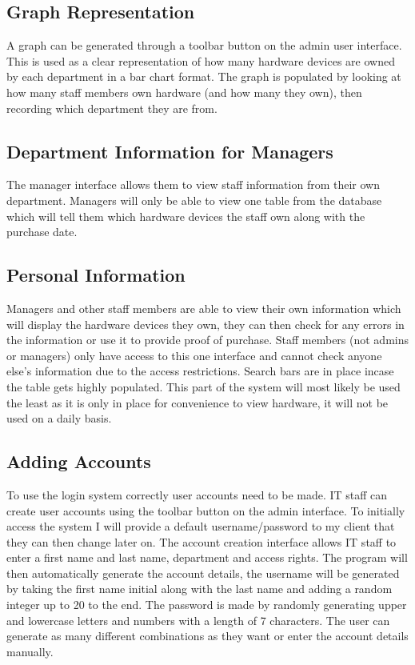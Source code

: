 \subsection{Graph Representation}

A graph can be generated through a toolbar button on the admin user interface. This is used as a clear representation of how many hardware devices are owned by each department in a bar chart format. The graph is populated by looking at how many staff members own hardware (and how many they own), then recording which department they are from.

\subsection{Department Information for Managers}

The manager interface allows them to view staff information from their own department. Managers will only be able to view one table from the database which will tell them which hardware devices the staff own along with the purchase date. 

\subsection{Personal Information}

Managers and other staff members are able to view their own information which will display the hardware devices they own, they can then check for any errors in the information or use it to provide proof of purchase. Staff members (not admins or managers) only have access to this one interface and cannot check anyone else's information due to the access restrictions. Search bars are in place incase the table gets highly populated. This part of the system will most likely be used the least as it is only in place for convenience to view hardware, it will not be used on a daily basis.

\subsection{Adding Accounts}

To use the login system correctly user accounts need to be made. IT staff can create user accounts using the toolbar button on the admin interface. To initially access the system I will provide a default username/password to my client that they can then change later on. The account creation interface allows IT staff to enter a first name and last name, department and access rights. The program will then automatically generate the account details, the username will be generated by taking the first name initial along with the last name and adding a random integer up to 20 to the end. The password is made by randomly generating upper and lowercase letters and numbers with a length of 7 characters. The user can generate as many different combinations as they want or enter the account details manually.

